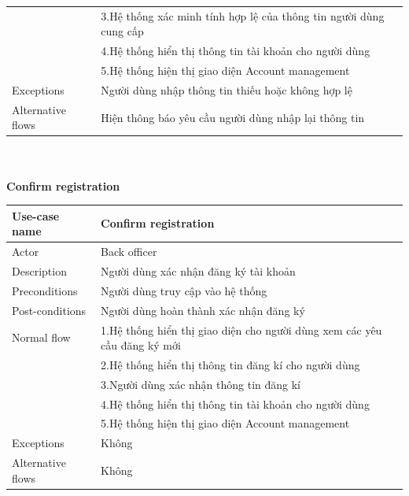 \documentclass[a4paper]{article}
\begin{document}
\begin{enumerate}
\begin{tabular}{| p{3cm} | p{10cm} |}
    & 3.Hệ thống xác minh tính hợp lệ của thông tin người dùng cung cấp \\
    & 4.Hệ thống hiển thị thông tin tài khoản cho người dùng \\

    & 5.Hệ thống hiện thị giao diện Account management \\
\hline
     Exceptions & Người dùng nhập thông tin thiếu hoặc không hợp lệ
     \\ \hline
     Alternative flows & Hiện thông báo yêu cầu người dùng nhập lại thông tin
     \\ \hline
     
\end{tabular}\\ 
\vspace{0.5cm} \\
\textbf{Confirm registration}\\
\begin{tabular}{| p{3cm} | p{10cm} |}
  \hline
     Use-case name & Confirm registration
     \\
     \hline
     Actor & Back officer
     \\ \hline
     Description & Người dùng xác nhận đăng ký tài khoản
      \\
     \hline
     Preconditions & Người dùng truy cập vào hệ thống
     \\ \hline
          Post-conditions & Người dùng hoàn thành xác nhận đăng ký
     \\ \hline
      Normal flow & 1.Hệ thống hiển thị giao diện cho người dùng xem các yêu cầu đăng ký mới
      \\
      & 2.Hệ thống hiển thị thông tin đăng kí cho người dùng  \\

    & 3.Người dùng xác nhận thông tin đăng kí\\
    & 4.Hệ thống hiển thị thông tin tài khoản cho người dùng \\

    & 5.Hệ thống hiện thị giao diện Account management \\
\hline
     Exceptions & Không
     \\ \hline
     Alternative flows & Không
     \\ \hline
     

\end{tabular}
\end{enumerate}
\end{document}
